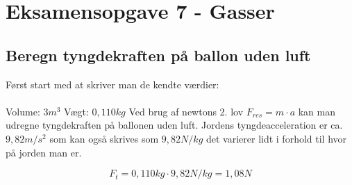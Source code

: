 \newpage
\section{Eksamensopgave 7 - Gasser}
\subsection{Beregn tyngdekraften på ballon uden luft}
Først start med at skriver man de kendte værdier:
\\\\
Volume: \begin{math}3m^3\end{math} \newline
Vægt: \begin{math}0,110kg\end{math} \newline
Ved brug af newtons 2. lov \begin{math}F_{res}=m\cdot a\end{math} kan man udregne tyngdekraften på ballonen uden luft. \newline
Jordens tyngdeacceleration er ca. \begin{math}9,82 m/s^2\end{math} som kan også skrives som \begin{math}9,82N/kg\end{math} det varierer lidt i forhold til hvor på jorden man er. \newline

\begin{equation}
	F_t=0,110kg\cdot9,82 N/kg=1,08N
\end{equation}

